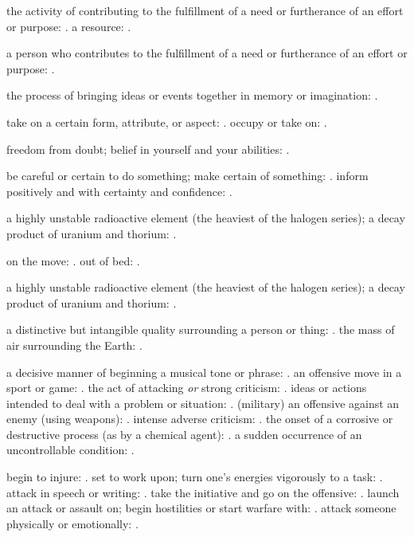   the activity of contributing to the fulfillment of a need or furtherance of an effort or purpose: . a resource: .

  a person who contributes to the fulfillment of a need or furtherance of an effort or purpose: .

  the process of bringing ideas or events together in memory or imagination: .

  take on a certain form, attribute, or aspect: . occupy or take on: .

  freedom from doubt; belief in yourself and your abilities: .

  be careful or certain to do something; make certain of something: . inform positively and with certainty and confidence: .

  a highly unstable radioactive element (the heaviest of the halogen series); a decay product of uranium and thorium: .

  on the move: . out of bed: .

  a highly unstable radioactive element (the heaviest of the halogen series); a decay product of uranium and thorium: .

  a distinctive but intangible quality surrounding a person or thing: . the mass of air surrounding the Earth: .

  a decisive manner of beginning a musical tone or phrase: . an offensive move in a sport or game: . the act of attacking \textit{or} strong criticism: . ideas or actions intended to deal with a problem or situation: . (military) an offensive against an enemy (using weapons): . intense adverse criticism: . the onset of a corrosive or destructive process (as by a chemical agent): . a sudden occurrence of an uncontrollable condition: .

  begin to injure: . set to work upon; turn one's energies vigorously to a task: . attack in speech or writing: . take the initiative and go on the offensive: . launch an attack or assault on; begin hostilities or start warfare with: . attack someone physically or emotionally: .


